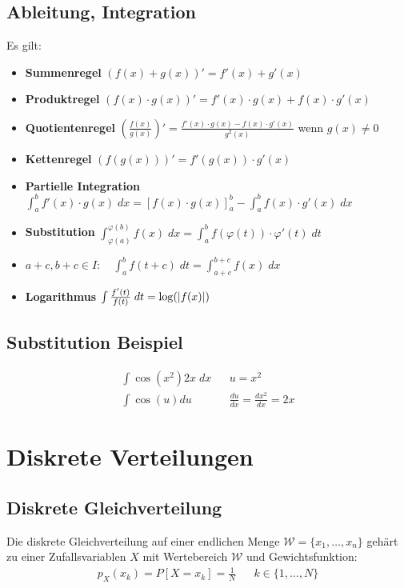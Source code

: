 \documentclass[8pt]{extarticle}
\newcommand{\W}{\mathcal{W}}
\begin{document}
\begin{multicols*}{3}
  \subsection*{Ableitung, Integration}
  Es gilt:
  \begin{itemize}
    \item \textbf{Summenregel} $(f(x) + g(x))' = f'(x) + g'(x)$
    \item \textbf{Produktregel} $(f(x) \cdot g(x))' = f'(x) \cdot g(x) + f(x) \cdot g'(x)$
    \item \textbf{Quotientenregel} $\left( \frac{f(x)}{g(x)} \right)' = \frac{f'(x) \cdot g(x) - f(x) \cdot g'(x)}{g^2(x)}$ wenn $g(x) \neq 0$
    \item \textbf{Kettenregel} $(f(g(x)))' = f'(g(x)) \cdot g'(x)$
    \item \textbf{Partielle Integration} $\int_a^b f'(x) \cdot g(x) \; dx = [f(x) \cdot g(x)]_a^b - \int_a^b f(x) \cdot g'(x) \; dx$
    \item \textbf{Substitution} $\int_{\varphi(a)}^{\varphi(b)} f(x) \; dx = \int_a^b f(\varphi(t)) \cdot \varphi'(t) \; dt$
    \item $a+c, b+c \in I: \quad \int_a^b f(t + c) \; dt = \int_{a+c}^{b+c} f(x) \; dx$
    \item \textbf{Logarithmus} $\int \frac{f'(t)}{f(t)} \; dt = \log(\abs{f(x)})$
  \end{itemize}
  \subsection*{Substitution Beispiel}
  \begin{align*}
    \int \cos(x^2) 2x \; dx &  & u = x^2                              \\
    \int \cos(u) du         &  & \frac{du}{dx} = \frac{dx^2}{dx} = 2x
  \end{align*}
  \hypertarget{sec:1}{\section{Diskrete Verteilungen}}
  \subsection*{Diskrete Gleichverteilung}
  Die diskrete Gleichverteilung auf einer endlichen Menge $\W = \{
    x_1, \dots, x_n \}$ gehärt zu einer Zufallsvariablen $X$ mit
  Wertebereich $\W$ und Gewichtsfunktion:
  \begin{align*}
    p_X(x_k) = P[X = x_k] = \frac{1}{N} &  & k \in \{1, \dots, N\}
  \end{align*}

\end{multicols*}
\end{document}
